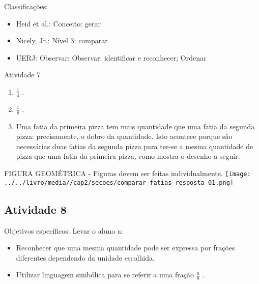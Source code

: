 \documentclass[oneside]{book}
\begin{document}
\begin{multicols}{2}
  Classificações:
\begin{itemize} %
    \item       Heid et al.: Conceito: gerar
    \item       Nicely, Jr.: Nível 3: comparar
    \item       UERJ: Observar: Observar: identificar e reconhecer; Ordenar
\end{itemize} %



\begin{resposta*}{Atividade 7}
\begin{enumerate} [\quad a)] %
    \item             $\frac{1}{4}$      .
    \item             $\frac{1}{8}$      .
    \item       Uma fatia da primeira pizza tem mais quantidade que uma fatia da segunda pizza: precisamente, o dobro da quantidade. Isto acontece porque são necessárias duas fatias da segunda pizza para ter-se a mesma quantidade de pizza que uma fatia da primeira pizza, como mostra o desenho a seguir.
\end{enumerate} %

  \begin{imagem*}[breakable]{}{}     FIGURA GEOMÉTRICA - Figuras devem ser feitas individualmente.
        \texttt{[image: ../../livro/media//cap2/secoes/comparar-fatias-resposta-01.png]}
  \end{imagem*}
\end{resposta*}





\subsection{Atividade 8}


  Objetivos específicos: Levar o aluno a:
\begin{itemize} %
    \item       Reconhecer que uma mesma quantidade pode ser expressa por frações diferentes dependendo da unidade escolhida.
    \item       Utilizar linguagem simbólica para se referir a uma fração       $\frac{a}{b}$      .
\end{itemize} %



\end{multicols}
\end{document}
